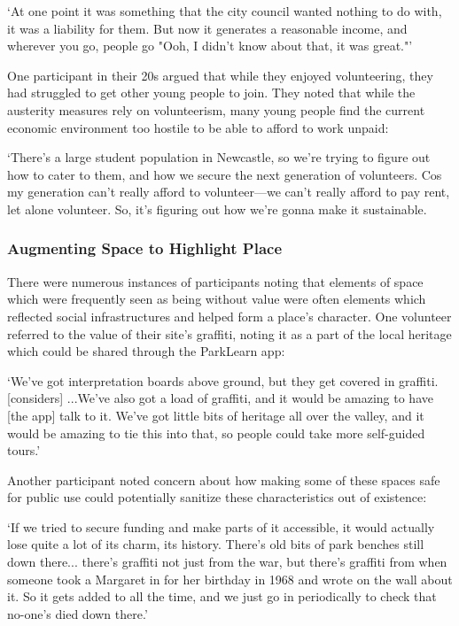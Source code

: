 \begin{displayquote}
`At one point it was something that the city council wanted nothing to do with, it was a liability for them. But now it generates a reasonable income, and wherever you go, people go "Ooh, I didn't know about that, it was great."' 
\end{displayquote}

One participant in their 20s argued that while they enjoyed volunteering, they had struggled to get other young people to join. They noted that while the austerity measures rely on volunteerism, many young people find the current economic environment too hostile to be able to afford to work unpaid: 

\begin{displayquote}
`There's a large student population in Newcastle, so we're trying to figure out how to cater to them, and how we secure the next generation of volunteers. Cos my generation can't really afford to volunteer---we can't really afford to pay rent, let alone volunteer. So, it's figuring out how we're gonna make it sustainable.
\end{displayquote}

\subsubsection{Augmenting Space to Highlight Place}

There were numerous instances of participants noting that elements of space which were frequently seen as being without value were often elements which reflected social infrastructures and helped form a place's character. One volunteer referred to the value of their site's graffiti, noting it as a part of the local heritage which could be shared through the ParkLearn app:

\begin{displayquote}
`We've got interpretation boards above ground, but they get covered in graffiti. [considers] ...We've also got a load of graffiti, and it would be amazing to have [the app] talk to it. We've got little bits of heritage all over the valley, and it would be amazing to tie this into that, so people could take more self-guided tours.'
\end{displayquote}

Another participant noted concern about how making some of these spaces safe for public use could potentially sanitize these characteristics out of existence:

\begin{displayquote}
`If we tried to secure funding and make parts of it accessible, it would actually lose quite a lot of its charm, its history. There's old bits of park benches still down there... there's graffiti not just from the war, but there's graffiti from when someone took a Margaret in for her birthday in 1968 and wrote on the wall about it. So it gets added to all the time, and we just go in periodically to check that no-one's died down there.'
\end{displayquote}

